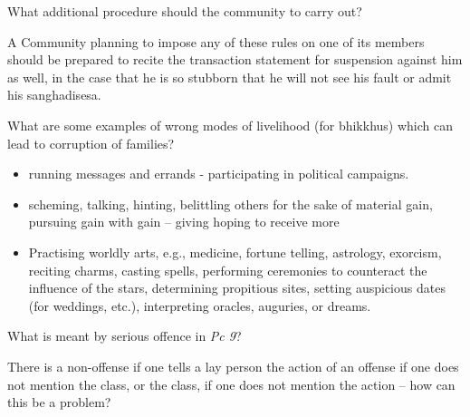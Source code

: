 \bigskip

What additional procedure should the community to carry out?

\begin{solution}
  A Community planning to impose any of these rules on one of its members should
  be prepared to recite the transaction statement for suspension against him as
  well, in the case that he is so stubborn that he will not see his fault or
  admit his sanghadisesa.
\end{solution}

\bigskip


What are some examples of wrong modes of livelihood (for bhikkhus) which can lead to corruption of families?

\begin{solution}
  \begin{itemize}
  
  \item running messages and errands - participating in political campaigns.
  
  \item scheming, talking, hinting, belittling others for the sake of material
    gain, pursuing gain with gain – giving hoping to receive more
  
  \item Practising worldly arts, e.g., medicine, fortune telling, astrology,
    exorcism, reciting charms, casting spells, performing ceremonies to counteract
    the influence of the stars, determining propitious sites, setting auspicious
    dates (for weddings, etc.), interpreting oracles, auguries, or dreams.
  
  \end{itemize}
\end{solution}

\bigskip


What is meant by serious offence in \emph{Pc 9}?

\bigskip

There is a non-offense if one tells a lay person the action of an offense if
one does not mention the class, or the class, if one does not mention the action
– how can this be a problem?

